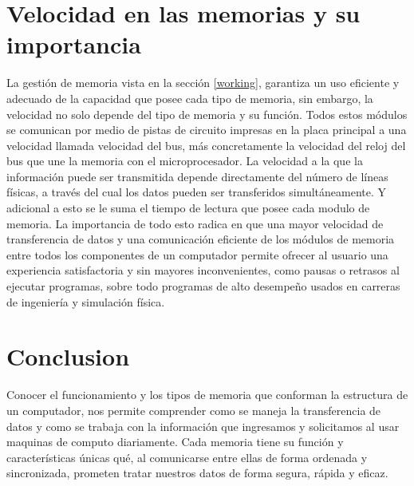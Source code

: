 \documentclass{article}
\begin{document}
\section{Velocidad en las memorias y su importancia}

La gestión de memoria vista en la sección \ref{working}, garantiza un uso eficiente y adecuado de la capacidad que posee cada tipo de memoria, sin embargo, la velocidad no solo depende del tipo de memoria y su función. Todos estos módulos se comunican por medio de pistas de circuito impresas en la placa principal a una velocidad llamada velocidad del bus, más concretamente la velocidad del reloj del bus que une la memoria con el microprocesador. \cite{augusto} La velocidad a la que la información puede ser transmitida depende directamente del número de líneas físicas, a través del cual los datos pueden ser transferidos simultáneamente. Y adicional a esto se le suma el tiempo de lectura que posee cada modulo de memoria. La importancia de todo esto radica en que una mayor velocidad de transferencia de datos y una comunicación eficiente de los módulos de memoria entre todos los componentes de un computador permite ofrecer al usuario una experiencia satisfactoria y sin mayores inconvenientes, como pausas o retrasos al ejecutar programas, sobre todo programas de alto desempeño usados en carreras de ingeniería y simulación física.


\section{Conclusion}
Conocer el funcionamiento y los tipos de memoria que conforman la estructura de un computador, nos permite comprender como se maneja la transferencia de datos y como se trabaja con la información que ingresamos y solicitamos al usar maquinas de computo diariamente. Cada memoria tiene su función y características únicas qué, al comunicarse entre ellas de forma ordenada y sincronizada, prometen tratar nuestros datos de forma segura, rápida y eficaz.



\end{document}
